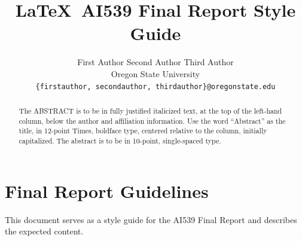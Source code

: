 \documentclass[10pt,twocolumn,letterpaper]{article}
\begin{document}
\title{\LaTeX\ AI539 Final Report Style Guide}

\author{First Author \hspace{20pt} Second Author \hspace{20 pt} Third Author\\
Oregon State University\\
{\tt\small \{firstauthor, secondauthor, thirdauthor\}@oregonstate.edu}
}
\maketitle

\begin{abstract}
   The ABSTRACT is to be in fully justified italicized text, at the top of the left-hand column, below the author and affiliation information.
   Use the word ``Abstract'' as the title, in 12-point Times, boldface type, centered relative to the column, initially capitalized.
   The abstract is to be in 10-point, single-spaced type.
\end{abstract}

\section{Final Report Guidelines}
\label{sec:intro}

This document serves as a style guide for the AI539 Final Report and describes the expected content. 
\end{document}

